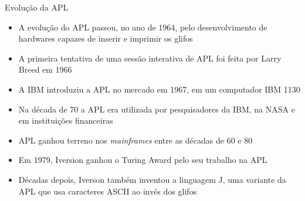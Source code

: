 \begin{frame}[fragile]{Evolução da APL}

    \begin{itemize}
        \item A evolução do APL passou, no ano de 1964, pelo desenvolvimento de hardwares capazes de inserir e imprimir os glifos
        \pause

        \item A primeira tentativa de uma sessão interativa de APL foi feita por Larry Breed em 1966
        \pause

        \item A IBM introduziu a APL no mercado em 1967, em um computador IBM 1130
        \pause

        \item Na década de 70 a APL era utilizada por pesquisadores da IBM, na NASA e em instituições financeiras
        \pause

        \item APL ganhou terreno nos \textit{mainframes} entre as décadas de 60 e 80
        \pause

        \item Em 1979, Iversion ganhou o Turing Award pelo seu trabalho na APL
        \pause

        \item Décadas depois, Iverson também inventou a linguagem J, uma variante da APL que usa caracteres ASCII ao invés dos glifos
    \end{itemize}

\end{frame}

